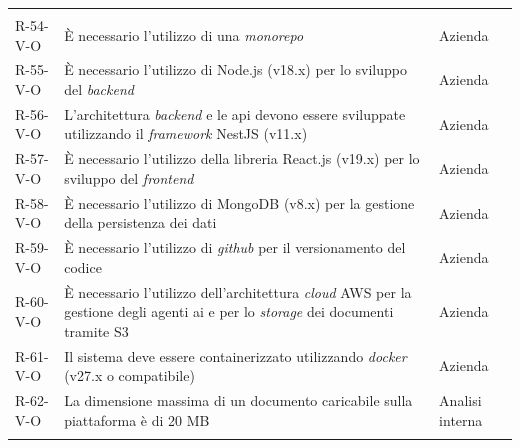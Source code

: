 \begin{longtable}{L{2cm} L{6.4cm} L{3cm}}
\hline
{}
 &  &  \\
\endfirsthead
\hline
{}
 &  &  \\
\endhead
\endfoot

R-54-V-O & È necessario l'utilizzo di una \emph{monorepo} & Azienda \\
\hline
R-55-V-O & È necessario l'utilizzo di Node.js (v18.x) per lo sviluppo del \emph{backend} & Azienda \\
\hline
R-56-V-O & L'architettura \emph{backend} e le \gls{api} devono essere sviluppate utilizzando il \emph{framework} NestJS (v11.x) & Azienda \\
\hline
R-57-V-O & È necessario l'utilizzo della libreria React.js (v19.x) per lo sviluppo del \emph{frontend} & Azienda \\
\hline
R-58-V-O & È necessario l'utilizzo di MongoDB (v8.x) per la gestione della persistenza dei dati & Azienda \\
\hline
R-59-V-O & È necessario l'utilizzo di \emph{\gls{github}} per il versionamento del codice & Azienda \\
\hline
R-60-V-O & È necessario l'utilizzo dell'architettura \emph{cloud} AWS per la gestione degli agenti \gls{ai} e per lo \emph{storage} dei documenti tramite S3 & Azienda \\
\hline
R-61-V-O & Il sistema deve essere containerizzato utilizzando \emph{\gls{docker}} (v27.x o compatibile) & Azienda \\
\hline
R-62-V-O & La dimensione massima di un documento caricabile sulla piattaforma è di 20 MB & Analisi interna \\
\hline
{}
\end{longtable}
\label{tab:requisiti-vincolo}